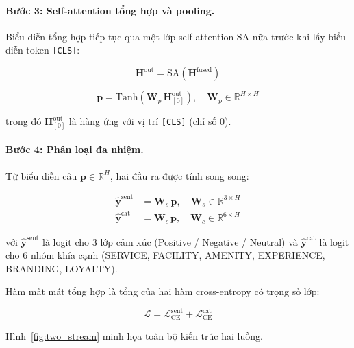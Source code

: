 \paragraph{Bước 3: Self-attention tổng hợp và pooling.}
Biểu diễn tổng hợp tiếp tục qua một lớp self-attention $\mathrm{SA}$
nữa trước khi lấy biểu diễn token \texttt{[CLS]}:

\begin{equation}
  \mathbf{H}^{\mathrm{out}} = \mathrm{SA}\!\left(
    \mathbf{H}^{\mathrm{fused}}
  \right)
  \label{eq:sa_final}
\end{equation}

\begin{equation}
  \mathbf{p} = \mathrm{Tanh}\!\left(
    \mathbf{W}_p\, \mathbf{H}^{\mathrm{out}}_{[0]}
  \right), \quad \mathbf{W}_p \in \mathbb{R}^{H \times H}
  \label{eq:pooler}
\end{equation}

\noindent trong đó $\mathbf{H}^{\mathrm{out}}_{[0]}$ là hàng ứng với
vị trí \texttt{[CLS]} (chỉ số 0).

\paragraph{Bước 4: Phân loại đa nhiệm.}
Từ biểu diễn câu $\mathbf{p} \in \mathbb{R}^H$, hai đầu ra được tính
song song:

\begin{align}
  \hat{\mathbf{y}}^{\mathrm{sent}} &= \mathbf{W}_s\, \mathbf{p},
    \quad \mathbf{W}_s \in \mathbb{R}^{3 \times H}
    \label{eq:head_sentiment}\\[4pt]
  \hat{\mathbf{y}}^{\mathrm{cat}} &= \mathbf{W}_c\, \mathbf{p},
    \quad \mathbf{W}_c \in \mathbb{R}^{6 \times H}
    \label{eq:head_category}
\end{align}

\noindent với $\hat{\mathbf{y}}^{\mathrm{sent}}$ là logit cho 3 lớp
cảm xúc (Positive / Negative / Neutral) và
$\hat{\mathbf{y}}^{\mathrm{cat}}$ là logit cho 6 nhóm khía cạnh
(SERVICE, FACILITY, AMENITY, EXPERIENCE, BRANDING, LOYALTY).

Hàm mất mát tổng hợp là tổng của hai hàm cross-entropy có trọng số
lớp:

\begin{equation}
  \mathcal{L} = \mathcal{L}_{\mathrm{CE}}^{\mathrm{sent}}
              + \mathcal{L}_{\mathrm{CE}}^{\mathrm{cat}}
  \label{eq:loss}
\end{equation}

Hình~\ref{fig:two_stream} minh họa toàn bộ kiến trúc hai luồng.

